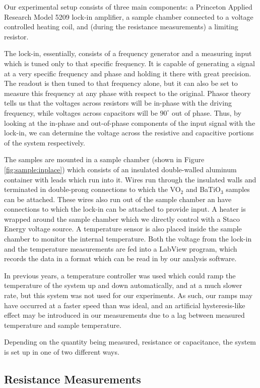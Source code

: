 \documentclass[%
 reprint,
 amsmath,amssymb,
 aps,
 pra,
]{revtex4-1}
\begin{document}
Our experimental setup consists of three main components: a Princeton Applied Research Model 5209 lock-in amplifier, a sample chamber connected to a voltage controlled heating coil, and (during the resistance measurements) a limiting resistor. 

The lock-in, essentially, consists of a frequency generator and a measuring input which is tuned only to that specific frequency. It is capable of generating a signal at a very specific frequency and phase and holding it there with great precision. The readout is then tuned to that frequency alone, but it can also be set to measure this frequency at any phase with respect to the original. Phasor theory tells us that the voltages across resistors  will be in-phase with the driving frequency, while voltages across capacitors will be $90^\circ$ out of phase. Thus, by looking at the in-phase and out-of-phase components of the input signal with the lock-in, we can determine the voltage across the resistive and capacitive portions of the system respectively.

The samples are mounted in a sample chamber (shown in Figure \ref{fig:sample:inplace}) which consists of an insulated double-walled aluminum container with leads which run into it. Wires run through the insulated walls and terminated in double-prong connections to which the VO$_2$ and BaTiO$_3$ samples can be attached. These wires also run out of the sample chamber an have connections to which the lock-in can be attached to provide input. A heater is wrapped around the sample chamber which we directly control with a Staco Energy voltage source. A temperature sensor is also placed inside the sample chamber to monitor the internal temperature. Both the voltage from the lock-in and the temperature measurements are fed into a LabView program, which records the data in a format which can be read in by our analysis software.

In previous years, a temperature controller was used which could ramp the temperature of the system up and down automatically, and at a much slower rate, but this system was not used for our experiments. As such, our ramps may have occurred at a faster speed than was ideal, and an artificial hysteresis-like effect may be introduced in our measurements due to a lag between measured temperature and sample temperature. 

Depending on the quantity being measured, resistance or capacitance, the system is set up in one of two different ways.

\subsection{Resistance Measurements}
\end{document}
